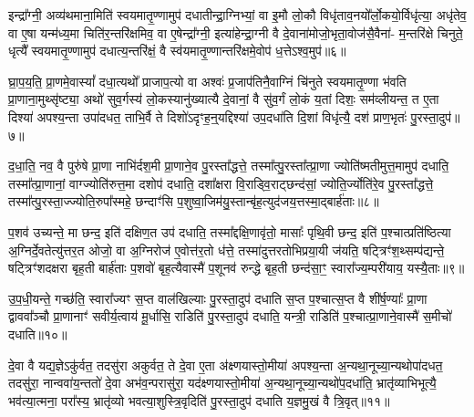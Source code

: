 {\anuvakamend[{कॢप्त्या॑ उप॒धाय॑ प्राण॒भृतः॒ सम॑नसः कृ॒ष्णे पुरु॑षो॒ वय॒ इति॒ पञ्च॑ च॥१॥}]}

इन्द्रा᳚ग्नी॒ अव्य॑थमाना॒मिति॑ स्वयमातृ॒ण्णामुप॑ दधातीन्द्रा॒ग्निभ्यां॒ वा इ॒मौ लो॒कौ विधृ॑ताव॒नयो᳚र्लो॒कयो॒र्विधृ॑त्या॒ अधृ॑तेव॒ वा ए॒षा यन्म॑ध्य॒मा चिति॑र॒न्तरि॑क्षमिव॒ वा ए॒षेन्द्रा᳚ग्नी॒ इत्या॑हेन्द्रा॒ग्नी वै दे॒वाना॑मोजो॒भृता॒वोज॑सै॒वैना॑- म॒न्तरि॑क्षे चिनुते॒ धृत्यै᳚ स्वयमातृ॒ण्णामुप॑ दधात्य॒न्तरि॑क्षं॒ वै स्व॑यमातृ॒ण्णान्तरि॑क्षमे॒वोप॑ ध॒त्ते\-ऽश्व॒मुप॑॥६॥

घ्रा॒प॒य॒ति॒ प्रा॒णमे॒वास्यां᳚ दधा॒त्यथो᳚ प्राजाप॒त्यो वा अश्वः॑ प्र॒जाप॑तिनै॒वाग्निं चि॑नुते स्वयमातृ॒ण्णा भ॑वति प्रा॒णाना॒मुथ्सृ॑ष्ट्या॒ अथो॑ सुव॒र्गस्य॑ लो॒कस्यानु॑ख्यात्यै दे॒वानां॒ वै सु॑व॒र्गं लो॒कं य॒तां दिशः॒ सम॑व्लीयन्त॒ त ए॒ता दिश्या॑ अपश्य॒न्ता उपा॑दधत॒ ताभि॒र्वै ते दिशो॑\-ऽदृꣳह॒न्॒यद्दिश्या॑ उप॒दधा॑ति दि॒शां विधृ॑त्यै॒ दश॑ प्राण॒भृतः॑ पु॒रस्ता॒दुप॑॥७॥

द॒धा॒ति॒ नव॒ वै पुरु॑षे प्रा॒णा नाभि॑र्दश॒मी प्रा॒णाने॒व पु॒रस्ता᳚द्धत्ते॒ तस्मा᳚त्पु॒रस्ता᳚त्प्रा॒णा ज्योति॑ष्मतीमुत्त॒मामुप॑ दधाति॒ तस्मा᳚त्प्रा॒णानां॒ वाग्ज्योति॑रुत्त॒मा दशोप॑ दधाति॒ दशा᳚क्षरा वि॒राड्वि॒राट्छन्द॑सां॒ ज्योति॒र्ज्योति॑रे॒व पु॒रस्ता᳚द्धत्ते॒ तस्मा᳚त्पु॒रस्ता॒ज्ज्योति॒रुपा᳚स्महे॒ छन्दाꣳ॑सि प॒शुष्वा॒जिम॑यु॒स्तान्बृ॑ह॒त्युद॑जय॒त्तस्मा॒द्बार्\mbox{}ह॑ताः॥८॥

प॒शव॑ उच्यन्ते॒ मा छन्द॒ इति॑ दक्षिण॒त उप॑ दधाति॒ तस्मा᳚द्दक्षि॒णावृ॑तो॒ मासाः᳚ पृथि॒वी छन्द॒ इति॑ प॒श्चात्प्रति॑ष्ठित्या अ॒ग्निर्दे॒वतेत्यु॑त्तर॒त ओजो॒ वा अ॒ग्निरोज॑ ए॒वोत्त॑र॒तो ध॑त्ते॒ तस्मा॑दुत्तरतोभिप्रया॒यी ज॑यति॒ षट्त्रिꣳ॑श॒थ्सम्प॑द्यन्ते॒ षट्त्रिꣳ॑शदक्षरा बृह॒ती बार्\mbox{}ह॑ताः प॒शवो॑ बृह॒त्यैवास्मै॑ प॒शूनव॑ रुन्द्धे बृह॒ती छन्द॑सा॒ꣳ॒ स्वारा᳚ज्य॒म्परी॑याय॒ यस्यै॒ताः॥९॥

उ॒प॒धी॒यन्ते॒ गच्छ॑ति॒ स्वारा᳚ज्यꣳ स॒प्त वाल॑खिल्याः पु॒रस्ता॒दुप॑ दधाति स॒प्त प॒श्चात्स॒प्त वै शी॑र्\mbox{}ष॒ण्याः᳚ प्रा॒णा द्वाववा᳚ञ्चौ प्रा॒णानाꣳ॑ सवीर्य॒त्वाय॑ मू॒र्धासि॒ राडिति॑ पु॒रस्ता॒दुप॑ दधाति॒ यन्त्री॒ राडिति॑ प॒श्चात्प्रा॒णाने॒वास्मै॑ स॒मीचो॑ दधाति॥१०॥

{}

दे॒वा वै यद्य॒ज्ञे\-ऽकु॑र्वत॒ तदसु॑रा अकुर्वत॒ ते दे॒वा ए॒ता अ॑क्ष्णयास्तो॒मीया॑ अपश्य॒न्ता अ॒न्यथा॒नूच्या॒न्यथोपा॑दधत॒ तदसु॑रा॒ नान्ववा॑य॒न्ततो॑ दे॒वा अभ॑व॒न्परासु॑रा॒ यद॑क्ष्णयास्तो॒मीया॑ अ॒न्यथा॒नूच्या॒न्यथो॑प॒दधा॑ति॒ भ्रातृ॑व्याभिभूत्यै॒ भव॑त्या॒त्मना॒ परा᳚स्य॒ भ्रातृ॑व्यो भवत्या॒शुस्त्रि॒वृदिति॑ पु॒रस्ता॒दुप॑ दधाति य॒ज्ञमु॒खं वै त्रि॒वृत्॥११॥

